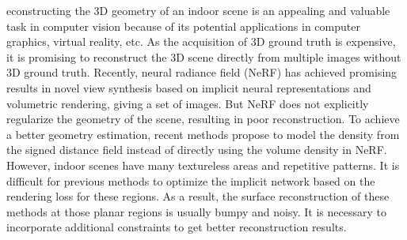 \documentclass[10pt,journal,compsoc]{IEEEtran}
\begin{document}
	
	\maketitle
	
	
	\IEEEdisplaynontitleabstractindextext
	
	
	
	\IEEEpeerreviewmaketitle
	
	
	
	econstructing the 3D geometry of an indoor scene is an appealing and valuable task in computer vision because of its potential applications in computer graphics, virtual reality, etc. As the acquisition of 3D ground truth is expensive, it is promising to reconstruct the 3D scene directly from multiple images without 3D ground truth.
	Recently, neural radiance field (NeRF) \cite{mildenhall2021nerf} has achieved promising results in novel view synthesis based on implicit neural representations and volumetric rendering, giving a set of images. But NeRF does not explicitly regularize the geometry of the scene, resulting in poor reconstruction. To achieve a better geometry estimation, recent methods \cite{oechsle2021unisurf,wang2021neus,yariv2021volume} propose to model the density from the signed distance field instead of directly using the volume density in NeRF. However, indoor scenes have many textureless areas and repetitive patterns. It is difficult for previous methods to optimize the implicit network based on the rendering loss for these regions. As a result, the surface reconstruction of these methods at those planar regions is usually bumpy and noisy. It is necessary to incorporate additional constraints to get better reconstruction results.
	
\end{document}
